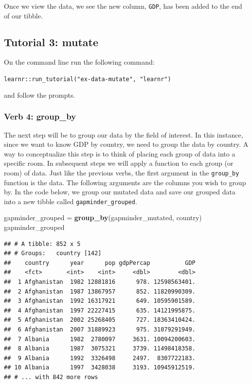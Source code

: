 \documentclass[]{book}
\newenvironment{Shaded}{\begin{snugshade}}{\end{snugshade}}
\newcommand{\KeywordTok}[1]{\textcolor[rgb]{0.13,0.29,0.53}{\textbf{#1}}}
\newcommand{\NormalTok}[1]{#1}
\newcommand{\StringTok}[1]{\textcolor[rgb]{0.31,0.60,0.02}{#1}}
\begin{document}
Once we view the data, we see the new column, \texttt{GDP}, has been added to the end of our tibble.

\hypertarget{tutorial-3-mutate}{%
\subsection{Tutorial 3: mutate}\label{tutorial-3-mutate}}

On the command line run the following command:

\texttt{learnr::run\_tutorial("ex-data-mutate",\ "learnr")}

and follow the prompts.

\hypertarget{verb-4-group_by}{%
\subsubsection{Verb 4: group\_by}\label{verb-4-group_by}}

The next step will be to group our data by the field of interest. In this instance, since we want to know GDP by country, we need to group the data by country. A way to conceptualize this step is to think of placing each group of data into a specific room. In subsequent steps we will apply a function to each group (or room) of data. Just like the previous verbs, the first argument in the \texttt{group\_by} function is the data. The following arguments are the columns you wish to group by. In the code below, we group our mutated data and save our grouped data into a new tibble called \texttt{gapminder\_grouped}.

\begin{Shaded}
\begin{Highlighting}[]
\NormalTok{gapminder_grouped =}\StringTok{ }\KeywordTok{group_by}\NormalTok{(gapminder_mutated, country) }
\NormalTok{gapminder_grouped}
\end{Highlighting}
\end{Shaded}

\begin{verbatim}
## # A tibble: 852 x 5
## # Groups:   country [142]
##    country      year      pop gdpPercap          GDP
##    <fct>       <int>    <int>     <dbl>        <dbl>
##  1 Afghanistan  1982 12881816      978. 12598563401.
##  2 Afghanistan  1987 13867957      852. 11820990309.
##  3 Afghanistan  1992 16317921      649. 10595901589.
##  4 Afghanistan  1997 22227415      635. 14121995875.
##  5 Afghanistan  2002 25268405      727. 18363410424.
##  6 Afghanistan  2007 31889923      975. 31079291949.
##  7 Albania      1982  2780097     3631. 10094200603.
##  8 Albania      1987  3075321     3739. 11498418358.
##  9 Albania      1992  3326498     2497.  8307722183.
## 10 Albania      1997  3428038     3193. 10945912519.
## # ... with 842 more rows
\end{verbatim}
\end{document}
